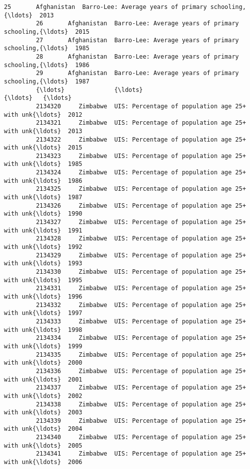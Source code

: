 \documentclass[11pt]{article}
\begin{document}
\begin{Verbatim}[commandchars=\\\{\}]
         25       Afghanistan  Barro-Lee: Average years of primary schooling,{\ldots}  2013   
         26       Afghanistan  Barro-Lee: Average years of primary schooling,{\ldots}  2015   
         27       Afghanistan  Barro-Lee: Average years of primary schooling,{\ldots}  1985   
         28       Afghanistan  Barro-Lee: Average years of primary schooling,{\ldots}  1986   
         29       Afghanistan  Barro-Lee: Average years of primary schooling,{\ldots}  1987   
         {\ldots}              {\ldots}                                                {\ldots}   {\ldots}   
         2134320     Zimbabwe  UIS: Percentage of population age 25+ with unk{\ldots}  2012   
         2134321     Zimbabwe  UIS: Percentage of population age 25+ with unk{\ldots}  2013   
         2134322     Zimbabwe  UIS: Percentage of population age 25+ with unk{\ldots}  2015   
         2134323     Zimbabwe  UIS: Percentage of population age 25+ with unk{\ldots}  1985   
         2134324     Zimbabwe  UIS: Percentage of population age 25+ with unk{\ldots}  1986   
         2134325     Zimbabwe  UIS: Percentage of population age 25+ with unk{\ldots}  1987   
         2134326     Zimbabwe  UIS: Percentage of population age 25+ with unk{\ldots}  1990   
         2134327     Zimbabwe  UIS: Percentage of population age 25+ with unk{\ldots}  1991   
         2134328     Zimbabwe  UIS: Percentage of population age 25+ with unk{\ldots}  1992   
         2134329     Zimbabwe  UIS: Percentage of population age 25+ with unk{\ldots}  1993   
         2134330     Zimbabwe  UIS: Percentage of population age 25+ with unk{\ldots}  1995   
         2134331     Zimbabwe  UIS: Percentage of population age 25+ with unk{\ldots}  1996   
         2134332     Zimbabwe  UIS: Percentage of population age 25+ with unk{\ldots}  1997   
         2134333     Zimbabwe  UIS: Percentage of population age 25+ with unk{\ldots}  1998   
         2134334     Zimbabwe  UIS: Percentage of population age 25+ with unk{\ldots}  1999   
         2134335     Zimbabwe  UIS: Percentage of population age 25+ with unk{\ldots}  2000   
         2134336     Zimbabwe  UIS: Percentage of population age 25+ with unk{\ldots}  2001   
         2134337     Zimbabwe  UIS: Percentage of population age 25+ with unk{\ldots}  2002   
         2134338     Zimbabwe  UIS: Percentage of population age 25+ with unk{\ldots}  2003   
         2134339     Zimbabwe  UIS: Percentage of population age 25+ with unk{\ldots}  2004   
         2134340     Zimbabwe  UIS: Percentage of population age 25+ with unk{\ldots}  2005   
         2134341     Zimbabwe  UIS: Percentage of population age 25+ with unk{\ldots}  2006   

\end{Verbatim}
\end{document}
